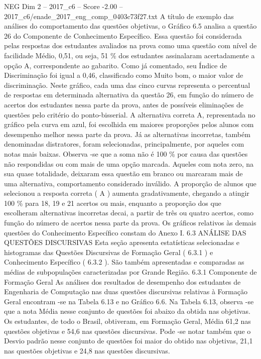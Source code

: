 \begin{textsample}{NEG Dim 2 – 2017\_c6 – Score -2.00 – 2017\_c6/enade\_2017\_eng\_comp\_0403c73f27.txt}
A título de exemplo das análises do comportamento das questões objetivas, o Gráfico 6.5 analisa a questão 26 do Componente de Conhecimento Específico.
Essa questão foi considerada pelas respostas dos estudantes avaliados na prova como uma questão com nível de facilidade Médio, 0,51, ou seja, 51 \% dos estudantes assinalaram acertadamente a opção A, correspondente ao gabarito.
Como já comentado, seu Índice de Discriminação foi igual a 0,46, classificado como Muito bom, o maior valor de discriminação.
Neste gráfico, cada uma das cinco curvas representa o percentual de respostas em determinada alternativa da questão 26, em função do número de acertos dos estudantes nessa parte da prova, antes de possíveis eliminações de questões pelo critério do ponto-bisserial.
A alternativa correta A, representada no gráfico pela curva em azul, foi escolhida em maiores proporções pelos alunos com desempenho melhor nessa parte da prova.
Já as alternativas incorretas, também denominadas distratores, foram selecionadas, principalmente, por aqueles com notas mais baixas.
Observa -se que a soma não é 100 \% por causa das questões não respondidas ou com mais de uma opção marcada.
Aqueles com nota zero, na sua quase totalidade, deixaram essa questão em branco ou marcaram mais de uma alternativa, comportamento considerado inválido.
A proporção de alunos que selecionou a resposta correta ( A ) aumenta gradativamente, chegando a atingir 100 \% para 18, 19 e 21 acertos ou mais, enquanto a proporção dos que escolheram alternativas incorretas decai, a partir de três ou quatro acertos, como função do número de acertos nessa parte da prova.
Os gráficos relativos às demais questões do Conhecimento Específico constam do Anexo I. 6.3 ANÁLISE DAS QUESTÕES DISCURSIVAS Esta seção apresenta estatísticas selecionadas e histogramas das Questões Discursivas de Formação Geral ( 6.3.1 ) e Conhecimento Específico ( 6.3.2 ).
São também apresentadas e comparadas as médias de subpopulações caracterizadas por Grande Região. 6.3.1 Componente de Formação Geral As análises dos resultados de desempenho dos estudantes de Engenharia de Computação nas duas questões discursivas relativas à Formação Geral encontram -se na Tabela 6.13 e no Gráfico 6.6.
Na Tabela 6.13, observa -se que a nota Média nesse conjunto de questões foi abaixo da obtida nas objetivas.
Os estudantes, de todo o Brasil, obtiveram, em Formação Geral, Média 61,2 nas questões objetivas e 54,6 nas questões discursivas.
Pode -se notar também que o Desvio padrão nesse conjunto de questões foi maior do obtido nas objetivas, 21,1 nas questões objetivas e 24,8 nas questões discursivas.

\end{textsample}
